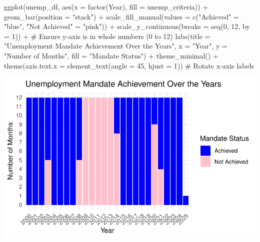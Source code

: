 \documentclass[
  letterpaper,
  DIV=11,
  numbers=noendperiod]{scrartcl}
\newenvironment{Shaded}{\begin{snugshade}}{\end{snugshade}}
\newcommand{\AttributeTok}[1]{\textcolor[rgb]{0.40,0.45,0.13}{#1}}
\newcommand{\CommentTok}[1]{\textcolor[rgb]{0.37,0.37,0.37}{#1}}
\newcommand{\DecValTok}[1]{\textcolor[rgb]{0.68,0.00,0.00}{#1}}
\newcommand{\FunctionTok}[1]{\textcolor[rgb]{0.28,0.35,0.67}{#1}}
\newcommand{\NormalTok}[1]{\textcolor[rgb]{0.00,0.23,0.31}{#1}}
\newcommand{\OtherTok}[1]{\textcolor[rgb]{0.00,0.23,0.31}{#1}}
\newcommand{\SpecialCharTok}[1]{\textcolor[rgb]{0.37,0.37,0.37}{#1}}
\newcommand{\StringTok}[1]{\textcolor[rgb]{0.13,0.47,0.30}{#1}}
\begin{document}
\begin{Shaded}
\begin{Highlighting}[]
\FunctionTok{ggplot}\NormalTok{(unemp\_df, }\FunctionTok{aes}\NormalTok{(}\AttributeTok{x =} \FunctionTok{factor}\NormalTok{(Year), }\AttributeTok{fill =}\NormalTok{ unemp\_criteria)) }\SpecialCharTok{+}
  \FunctionTok{geom\_bar}\NormalTok{(}\AttributeTok{position =} \StringTok{"stack"}\NormalTok{) }\SpecialCharTok{+}  
  \FunctionTok{scale\_fill\_manual}\NormalTok{(}\AttributeTok{values =} \FunctionTok{c}\NormalTok{(}\StringTok{"Achieved"} \OtherTok{=} \StringTok{"blue"}\NormalTok{, }\StringTok{"Not Achieved"} \OtherTok{=} \StringTok{"pink"}\NormalTok{)) }\SpecialCharTok{+}
  \FunctionTok{scale\_y\_continuous}\NormalTok{(}\AttributeTok{breaks =} \FunctionTok{seq}\NormalTok{(}\DecValTok{0}\NormalTok{, }\DecValTok{12}\NormalTok{, }\AttributeTok{by =} \DecValTok{1}\NormalTok{)) }\SpecialCharTok{+}  \CommentTok{\# Ensure y{-}axis is in whole numbers (0 to 12)}
  \FunctionTok{labs}\NormalTok{(}\AttributeTok{title =} \StringTok{"Unemployment Mandate Achievement Over the Years"}\NormalTok{,}
       \AttributeTok{x =} \StringTok{"Year"}\NormalTok{,}
       \AttributeTok{y =} \StringTok{"Number of Months"}\NormalTok{,}
       \AttributeTok{fill =} \StringTok{"Mandate Status"}\NormalTok{) }\SpecialCharTok{+}
  \FunctionTok{theme\_minimal}\NormalTok{() }\SpecialCharTok{+}
  \FunctionTok{theme}\NormalTok{(}\AttributeTok{axis.text.x =} \FunctionTok{element\_text}\NormalTok{(}\AttributeTok{angle =} \DecValTok{45}\NormalTok{, }\AttributeTok{hjust =} \DecValTok{1}\NormalTok{))  }\CommentTok{\# Rotate x{-}axis labels}
\end{Highlighting}
\end{Shaded}

\includegraphics{Assignment2_Data608_Quarto_files/figure-pdf/unnamed-chunk-30-1.pdf}
\end{document}
